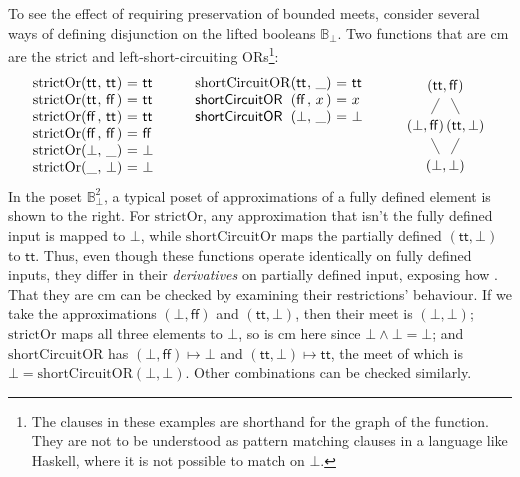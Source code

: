 \begin{example}
  To see the effect of requiring preservation of bounded meets,
  consider several ways of defining disjunction on the lifted booleans
  $\mathbb{B}_\bot$. Two functions that are cm are the strict and
  left-short-circuiting ORs\footnote{The clauses in these examples are
    shorthand for the graph of the function. They are not to be
    understood as pattern matching clauses in a language like Haskell,
    where it is not possible to match on $\bot$.}:
  \begin{displaymath}
    \begin{array}[t]{l@{(}l@{,~}l@{)~}c@{~}l}
      \mathrm{strictOr}&\mathsf{tt}&\mathsf{tt}&=&\mathsf{tt} \\
      \mathrm{strictOr}&\mathsf{tt}&\mathsf{ff}&=&\mathsf{tt} \\
      \mathrm{strictOr}&\mathsf{ff}&\mathsf{tt}&=&\mathsf{tt} \\
      \mathrm{strictOr}&\mathsf{ff}&\mathsf{ff}&=&\mathsf{ff} \\
      \mathrm{strictOr}&\bot&\_&=&\bot \\
      \mathrm{strictOr}&\_&\bot&=&\bot \\
    \end{array}
    \qquad
    \begin{array}[t]{l@{(}l@{,~}l@{)~}c@{~}l}
      \mathrm{shortCircuitOR}&\mathsf{tt}&\_&=&\mathsf{tt} \\
      \mathsf{shortCircuitOR}&\mathsf{ff}&x&=&x \\
      \mathsf{shortCircuitOR}&\bot&\_& =& \bot
    \end{array}
    \qquad
    \raisebox{-15ex}{
      \begin{tikzpicture}
        \node (top) at (0,0) {$(\mathsf{tt},\mathsf{ff})$};
        \node [below of=top,xshift=-0.5cm] (oi) {$(\bot,\mathsf{ff})$};
        \node [below of=top,xshift=0.5cm] (io) {$(\mathsf{tt},\bot)$};
        \node [below of=oi,xshift=0.5cm] (oo) {$(\bot,\bot)$};
        \draw (top) -- (oi);
        \draw (top) -- (io);
        \draw (oi) -- (oo);
        \draw (io) -- (oo);
      \end{tikzpicture}
    }
  \end{displaymath}
  In the poset $\mathbb{B}_\bot^2$, a typical poset of approximations of a fully defined element is shown to the right. For $\mathrm{strictOr}$, any approximation that isn't the fully defined input is mapped to $\bot$, while $\mathrm{shortCircuitOr}$ maps the partially defined $(\mathsf{tt},\bot)$ to $\mathsf{tt}$. Thus, even though these functions operate identically on fully defined inputs, they differ in their \emph{derivatives} on partially defined input, exposing how . That they are cm can be checked by examining their restrictions' behaviour. If we take the approximations $(\bot,\mathsf{ff})$ and $(\mathsf{tt},\bot)$, then their meet is $(\bot,\bot)$; $\mathrm{strictOr}$ maps all three elements to $\bot$, so is cm here since $\bot \wedge \bot = \bot$; and $\mathrm{shortCircuitOR}$ has $(\bot,\mathsf{ff}) \mapsto \bot$ and $(\mathsf{tt},\bot) \mapsto \mathsf{tt}$, the meet of which is $\bot = \mathrm{shortCircuitOR}(\bot,\bot)$. Other combinations can be checked similarly.

\end{example}
